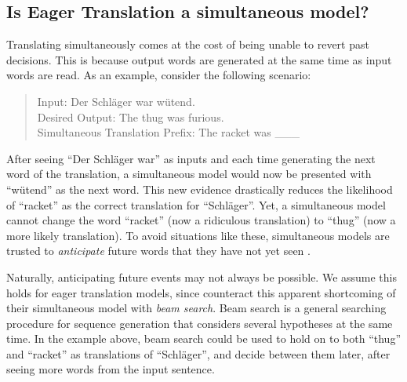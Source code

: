 \documentclass[english]{uzhpub}
\begin{document}

\subsection{Is Eager Translation a simultaneous model?}

Translating simultaneously comes at the cost of being unable to revert past decisions. This is because output words are generated at the same time as input words are read. As an example, consider the following scenario:

\begin{quote}
    Input: \hspace{39.5mm} Der Schläger war wütend.\\
    Desired Output: \hspace{24mm} The thug was furious. \\
    Simultaneous Translation Prefix: The racket was \_\_\_
\end{quote}

\noindent After seeing ``Der Schläger war'' as inputs and each time generating the next word of the translation, a simultaneous model would now be presented with ``wütend'' as the next word. This new evidence drastically reduces the likelihood of ``racket'' as the correct translation for ``Schläger''. Yet, a simultaneous model cannot change the word ``racket'' (now a ridiculous translation) to ``thug'' (now a more likely translation). To avoid situations like these, simultaneous models are trusted to \textit{anticipate} future words that they have not yet seen \cite{ma-etal-2019-stacl}.



Naturally, anticipating future events may not always be possible. We assume this holds for eager translation models, since \cite{youmaynotneedattention} counteract this apparent shortcoming of their simultaneous model with \textit{beam search}. Beam search is a general searching procedure for sequence generation that considers several hypotheses at the same time. In the example above, beam search could be used to hold on to both ``thug'' and ``racket'' as translations of ``Schläger'', and decide between them later, after seeing more words from the input sentence.
\end{document}
